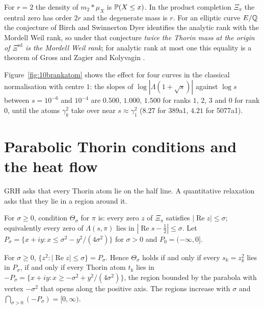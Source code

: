 For $r=2$ the density of $m_2*\mu_X$ is $\mathbb{P}(X\le x)$. In the product completion $\Xi_\pi$ the central zero has order $2r$ and the degenerate mass is $r$. For an elliptic curve $E/\mathbb{Q}$ the conjecture of Birch and Swinnerton Dyer \cite{bsd1965} identifies the analytic rank with the Mordell Weil rank, so under that conjecture \emph{twice the Thorin mass at the origin of $\Xi^{\mathrm{sd}}$ is the Mordell Weil rank}; for analytic rank at most one this equality is a theorem of Gross and Zagier \cite{grosszagier1986} and Kolyvagin \cite{kolyvagin1988}.

Figure~\ref{fig:10brankatom} shows the effect for four curves in the classical normalisation with centre $1$: the slopes of $\log|\Lambda(1+\sqrt s)|$ against $\log s$ between $s = 10^{-6}$ and $10^{-4}$ are $0.500$, $1.000$, $1.500$ for ranks $1$, $2$, $3$ and $0$ for rank $0$, until the atoms $\gamma_k^2$ take over near $s\approx\gamma_1^2$ ($8.27$ for 389a1, $4.21$ for 5077a1).

\section{Parabolic Thorin conditions and the heat flow}\label{sec:10bparabola}

GRH asks that every Thorin atom lie on the half line. A quantitative relaxation asks that they lie in a region around it.

\begin{definition}\label{def:10btheta}
For $\sigma\ge0$, condition $\Theta_\sigma$ for $\pi$ is: every zero $z$ of $\Xi_\pi$ satisfies $|\operatorname{Re}z|\le\sigma$; equivalently every zero of $\Lambda(s,\pi)$ lies in $|\operatorname{Re}s-\frac12|\le\sigma$. Let $P_\sigma = \{x+iy:x\le\sigma^2-y^2/(4\sigma^2)\}$ for $\sigma>0$ and $P_0 = (-\infty,0]$.
\end{definition}

\begin{lemma}\label{lem:10bparabola}
For $\sigma\ge0$, $\{z^2:|\operatorname{Re}z|\le\sigma\} = P_\sigma$. Hence $\Theta_\sigma$ holds if and only if every $s_k = z_k^2$ lies in $P_\sigma$, if and only if every Thorin atom $t_k$ lies in $-P_\sigma = \{x+iy:x\ge-\sigma^2+y^2/(4\sigma^2)\}$, the region bounded by the parabola with vertex $-\sigma^2$ that opens along the positive axis. The regions increase with $\sigma$ and $\bigcap_{\sigma>0}(-P_\sigma) = [0,\infty)$.
\end{lemma}

